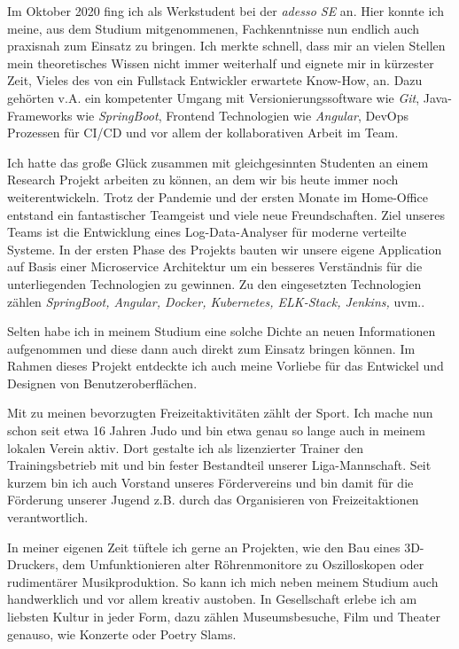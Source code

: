 \documentclass[11pt, a4paper]{awesome-cv}
\begin{document}
\begin{cvletter}
  Im Oktober 2020 fing ich als Werkstudent bei der \textit{adesso SE} an. Hier konnte ich meine, aus dem Studium mitgenommenen, Fachkenntnisse nun endlich auch praxisnah zum Einsatz zu bringen. Ich merkte schnell, dass mir an vielen Stellen mein theoretisches Wissen nicht immer weiterhalf und eignete mir in kürzester Zeit, Vieles des von ein Fullstack Entwickler erwartete Know-How, an. Dazu gehörten v.A. ein kompetenter Umgang mit Versionierungssoftware wie \textit{Git}, Java-Frameworks wie \textit{SpringBoot}, Frontend Technologien wie \textit{Angular}, DevOps Prozessen für CI/CD und vor allem der kollaborativen Arbeit im Team.

  Ich hatte das große Glück zusammen mit gleichgesinnten Studenten an einem Research Projekt arbeiten zu können, an dem wir bis heute immer noch weiterentwickeln. Trotz der Pandemie und der ersten Monate im Home-Office entstand ein fantastischer Teamgeist und viele neue Freundschaften. Ziel unseres Teams ist die Entwicklung eines Log-Data-Analyser für moderne verteilte Systeme. In der ersten Phase des Projekts bauten wir unsere eigene Application auf Basis einer Microservice Architektur um ein besseres Verständnis für die unterliegenden Technologien zu gewinnen. Zu den eingesetzten Technologien zählen \textit{SpringBoot, Angular, Docker, Kubernetes, ELK-Stack, Jenkins,} uvm..

  Selten habe ich in meinem Studium eine solche Dichte an neuen Informationen aufgenommen und diese dann auch direkt zum Einsatz bringen können. Im Rahmen dieses Projekt entdeckte ich auch meine Vorliebe für das Entwickel und Designen von Benutzeroberflächen.


  Mit zu meinen bevorzugten Freizeitaktivitäten zählt der Sport. Ich mache nun schon seit etwa 16 Jahren Judo und bin etwa genau so lange auch in meinem lokalen Verein aktiv. Dort gestalte ich als lizenzierter Trainer den Trainingsbetrieb mit und bin fester Bestandteil unserer Liga-Mannschaft. Seit kurzem bin ich auch Vorstand unseres Fördervereins und bin damit für die Förderung unserer Jugend z.B. durch das Organisieren von Freizeitaktionen verantwortlich.

  In meiner eigenen Zeit tüftele ich gerne an Projekten, wie den Bau eines 3D-Druckers, dem Umfunktionieren alter Röhrenmonitore zu Oszilloskopen oder rudimentärer Musikproduktion. So kann ich mich neben meinem Studium auch handwerklich und vor allem kreativ austoben. In Gesellschaft erlebe ich am liebsten Kultur in jeder Form, dazu zählen Museumsbesuche, Film und Theater genauso, wie Konzerte oder Poetry Slams.


\end{cvletter}
\end{document}
